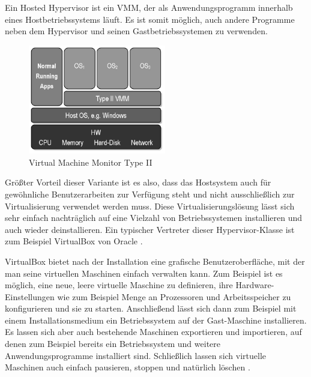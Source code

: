 
Ein Hosted Hypervisor ist ein \ac{VMM}, der als Anwendungsprogramm innerhalb eines Hostbetriebssystems läuft. Es ist somit möglich, auch andere Programme neben dem Hypervisor und seinen Gastbetriebssystemen zu verwenden.

\begin{figure}[!ht]
  \begin{center}
    \includegraphics[width=6cm]{bilder/VMM-Type2.jpg}
    \caption{Virtual Machine Monitor Type II \citep{wiki:003}}
  \end{center}
\end{figure}

Größter Vorteil dieser Variante ist es also, dass das Hostsystem auch für gewöhnliche Benutzerarbeiten zur Verfügung steht und nicht ausschließlich zur Virtualisierung verwendet werden muss. Diese Virtualisierungslösung lässt sich sehr einfach nachträglich auf eine Vielzahl von Betriebssystemen installieren und auch wieder deinstallieren. Ein typischer Vertreter dieser Hypervisor-Klasse ist zum Beispiel VirtualBox von Oracle \citep[Vgl.][S. 24]{DamMohAnd12}.

VirtualBox bietet nach der Installation eine grafische Benutzeroberfläche, mit der man seine virtuellen Maschinen einfach verwalten kann. Zum Beispiel ist es möglich, eine neue, leere virtuelle Maschine zu definieren, ihre Hardware-Einstellungen wie zum Beispiel Menge an Prozessoren und Arbeitsspeicher zu konfigurieren und sie zu starten. Anschließend lässt sich dann zum Beispiel mit einem Installationsmedium ein Betriebssystem auf der Gast-Maschine installieren. Es lassen sich aber auch bestehende Maschinen exportieren und importieren, auf denen zum Beispiel bereits ein Betriebssystem und weitere Anwendungsprogramme installiert sind. Schließlich lassen sich virtuelle Maschinen auch einfach pausieren, stoppen und natürlich löschen \citep[Vgl.][S. 11 ff.]{Oracle14}.

